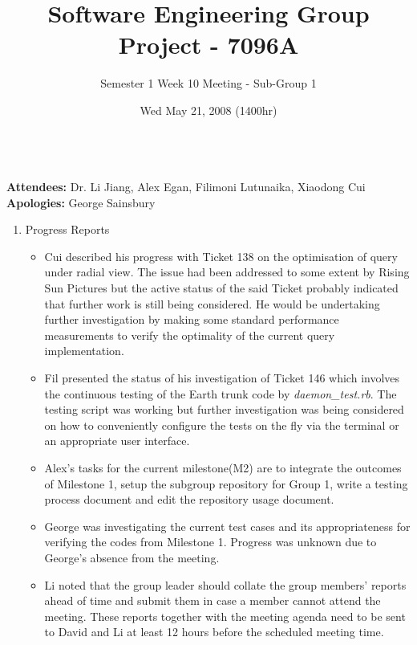 \documentclass[10pt, a4]{article}
\begin{document}
\title{Software Engineering Group Project - 7096A}
\author{Semester 1 Week 10 Meeting - Sub-Group 1}
\date{Wed May 21, 2008 (1400hr)}

\maketitle
 
\\
 
\noindent \textbf{Attendees:} Dr. Li Jiang, Alex Egan, Filimoni Lutunaika, Xiaodong Cui\\
\textbf{Apologies:} George Sainsbury\\

\begin{enumerate}
\item Progress Reports
  \begin{itemize}
  \item Cui described his progress with Ticket 138 on the optimisation of query under radial view. The issue had been addressed to some extent by Rising Sun Pictures but the active status of the said Ticket probably indicated that further work is still being considered. He would be undertaking further investigation by making some standard performance measurements to verify the optimality of the current query implementation.
  \item Fil presented the status of his investigation of Ticket 146 which involves the continuous testing of the Earth trunk code by \emph{daemon\_test.rb}. The testing script was working but further investigation was being considered on how to conveniently configure the tests on the fly via the terminal or an appropriate user interface.
  \item Alex's tasks for the current milestone(M2) are to integrate the outcomes of Milestone 1, setup the subgroup repository for Group 1, write a testing process document and edit the repository usage document.
  \item George was investigating the current test cases and its appropriateness for verifying the codes from Milestone 1. Progress was unknown due to George's absence from the meeting.
  \item Li noted that the group leader should collate the group members' reports ahead of time and submit them in case a member cannot attend the meeting. These reports together with the meeting agenda need to be sent to David and Li at least 12 hours before the scheduled meeting time.

\end{itemize}
\end{enumerate}
\end{document}

